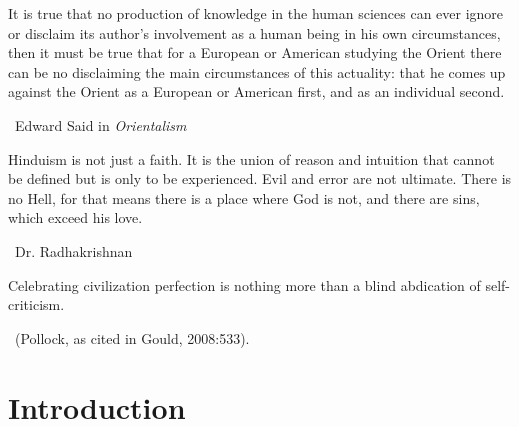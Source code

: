\begin{myquote}
It is true that no production of knowledge in the human sciences can ever ignore or disclaim its author’s involvement as a human being in his own circumstances, then it must be true that for a European or American studying the Orient there can be no disclaiming the main circumstances of this actuality: that he comes up against the Orient as a European or American first, and as an individual second. 

~\hfill Edward Said in \textit{Orientalism}
\end{myquote}

\begin{myquote}
Hinduism is not just a faith. It is the union of reason and intuition that cannot be defined but is only to be experienced. Evil and error are not ultimate. There is no Hell, for that means there is a place where God is not, and there are sins, which exceed his love. 

~\hfill Dr. Radhakrishnan
\end{myquote}

\begin{myquote}
Celebrating civilization perfection is nothing more than a blind abdication of self-criticism. 

~\hfill (Pollock, as cited in Gould, 2008:533).
\end{myquote}


\section*{Introduction}

